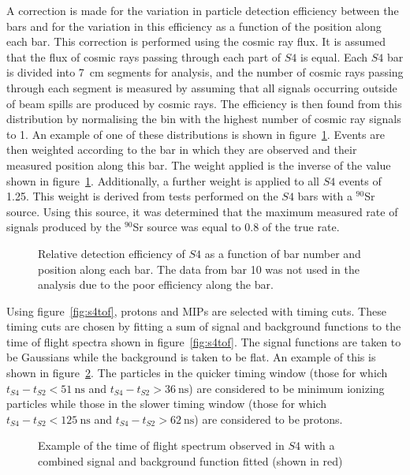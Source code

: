 A correction is made for the variation in particle detection efficiency between the bars and for the variation in this efficiency as a function of the position along each bar.
This correction is performed using the cosmic ray flux.
It is assumed that the flux of cosmic rays passing through each part of $\mathit{S4}$ is equal.
Each $\mathit{S4}$ bar is divided into 7~cm segments for analysis, and the number of cosmic rays passing through each segment is measured by assuming that all signals occurring outside of beam spills are produced by cosmic rays.
The efficiency is then found from this distribution by normalising the bin with the highest number of cosmic ray signals to 1.
An example of one of these distributions is shown in figure~\ref{fig:s4PosEff}.
Events are then weighted according to the bar in which they are observed and their measured position along this bar.
The weight applied is the inverse of the value shown in figure~\ref{fig:s4PosEff}.
Additionally, a further weight is applied to all $\mathit{S4}$ events of 1.25.
This weight is derived from tests performed on the $\mathit{S4}$ bars with a $^{90}$Sr source.
Using this source, it was determined that the maximum measured rate of signals produced by the $^{90}$Sr source was equal to 0.8 of the true rate.


\begin{figure}
  \begin{adjustbox}{width=.7\textwidth, center}
    
  \end{adjustbox}
  \caption{Relative detection efficiency of $\mathit{S4}$ as a function of bar number and position along each bar. The data from bar 10 was not used in the analysis due to the poor efficiency along the bar.}
  \label{fig:s4PosEff}
\end{figure}

Using figure~\ref{fig:s4tof}, protons and MIPs are selected with timing cuts. 
These timing cuts are chosen by fitting a sum of signal and background functions to the time of flight spectra shown in figure~\ref{fig:s4tof}. 
The signal functions are taken to be Gaussians while the background is taken to be flat. 
An example of this is shown in figure~\ref{fig:fitEx}.
The particles in the quicker timing window (those for which $t_{\mathit{S4}}-t_{\mathit{S2}}<51~\text{ns}$ and $t_{\mathit{S4}}-t_{\mathit{S2}}>36~\text{ns}$) are considered to be minimum ionizing particles while those in the slower timing window (those for which $t_{\mathit{S4}}-t_{\mathit{S2}}<125~\text{ns}$ and $t_{\mathit{S4}}-t_{\mathit{S2}}>62~\text{ns}$) are considered to be protons.

\begin{figure}[ht]
  \begin{adjustbox}{max totalsize={\textwidth}{.62\textheight},center}
    
  \end{adjustbox}
  \caption{Example of the time of flight spectrum observed in $\mathit{S4}$ with a combined signal and background function fitted (shown in red)}
  \label{fig:fitEx}
\end{figure}



